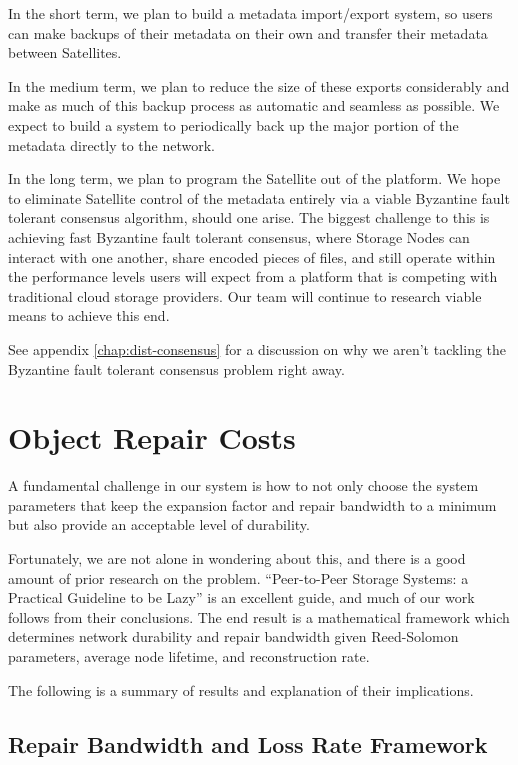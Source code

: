 \documentclass[8pt,fleqn,openany]{book}
\begin{document}
In the short term, we plan to build a metadata import/export system, so users
can make backups of their metadata on their own and transfer their metadata
between Satellites.

In the medium term, we plan to reduce the size of these exports considerably
and make as much of this backup process as automatic and seamless as possible.
We expect to build a system to periodically back up the major portion of the metadata
directly to the network.

In the long term, we plan to program the Satellite out of the platform.
We hope to eliminate Satellite control of the metadata
entirely via a viable Byzantine fault tolerant consensus algorithm, should
one arise.
The biggest challenge to this is achieving fast Byzantine fault tolerant
consensus, where Storage Nodes can interact with one another, share encoded
pieces of files, and still operate within the performance levels users will
expect from a platform that is competing with traditional cloud storage
providers. Our team will continue to research viable means to achieve this end.

See appendix \ref{chap:dist-consensus} for a discussion on why
we aren't tackling the Byzantine fault tolerant consensus problem right away.

\newpage \appendix

\chapter{Object Repair Costs}

A fundamental challenge in our system is how to not only choose the system
parameters that keep the expansion factor and repair bandwidth to a minimum but
also provide an acceptable level of durability.

Fortunately, we are not alone in wondering about this, and there is a good
amount of prior research on the problem.
``Peer-to-Peer Storage Systems: a Practical Guideline to be Lazy'' \cite{p2p-lazy} is an excellent guide, and much of our work follows from their conclusions.
The end result is a mathematical framework which determines network durability
and repair bandwidth given Reed-Solomon parameters, average node lifetime, and
reconstruction rate.

The following is a summary of results and explanation of their implications.

\section{Repair Bandwidth and Loss Rate Framework}
\end{document}
